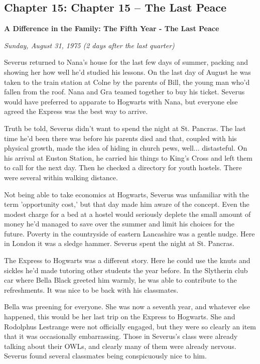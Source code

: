 \documentclass[a4paper,11pt]{article}
\begin{document}
\subsection{Chapter 15: Chapter 15 – The Last Peace}

\textbf{A Difference in the Family: The Fifth Year - The Last Peace}

\emph{Sunday, August 31, 1975 (2 days after the last quarter)}

Severus returned to Nana's house for the last few days of summer, packing and showing her how well he'd studied his lessons. On the last day of August he was taken to the train station at Colne by the parents of Bill, the young man who'd fallen from the roof. Nana and Gra teamed together to buy his ticket. Severus would have preferred to apparate to Hogwarts with Nana, but everyone else agreed the Express was the best way to arrive.

Truth be told, Severus didn't want to spend the night at St. Pancras. The last time he'd been there was before his parents died and that, coupled with his physical growth, made the idea of hiding in church pews, well... distasteful. On his arrival at Euston Station, he carried his things to King's Cross and left them to call for the next day. Then he checked a directory for youth hostels. There were several within walking distance.

Not being able to take economics at Hogwarts, Severus was unfamiliar with the term 'opportunity cost,' but that day made him aware of the concept. Even the modest charge for a bed at a hostel would seriously deplete the small amount of money he'd managed to save over the summer and limit his choices for the future. Poverty in the countryside of eastern Lancashire was a gentle nudge. Here in London it was a sledge hammer. Severus spent the night at St. Pancras.

The Express to Hogwarts was a different story. Here he could use the knuts and sickles he'd made tutoring other students the year before. In the Slytherin club car where Bella Black greeted him warmly, he was able to contribute to the refreshments. It was nice to be back with his classmates.

Bella was preening for everyone. She was now a seventh year, and whatever else happened, this would be her last trip on the Express to Hogwarts. She and Rodolphus Lestrange were not officially engaged, but they were so clearly an item that it was occasionally embarrassing. Those in Severus's class were already talking about their OWLs, and clearly many of them were already nervous. Severus found several classmates being conspicuously nice to him.
\end{document}
